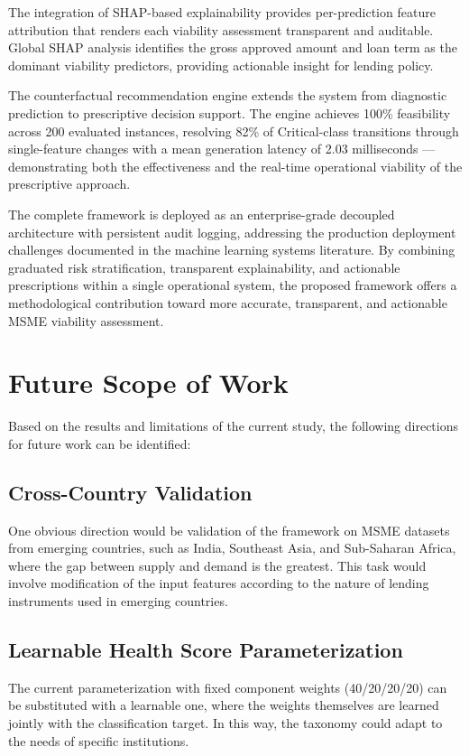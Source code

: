 \documentclass[12pt,a4paper]{report}
\begin{document}
The integration of SHAP-based explainability provides per-prediction feature attribution that renders each viability assessment transparent and auditable. Global SHAP analysis identifies the gross approved amount and loan term as the dominant viability predictors, providing actionable insight for lending policy.

The counterfactual recommendation engine extends the system from diagnostic prediction to prescriptive decision support. The engine achieves 100\% feasibility across 200 evaluated instances, resolving 82\% of Critical-class transitions through single-feature changes with a mean generation latency of 2.03 milliseconds --- demonstrating both the effectiveness and the real-time operational viability of the prescriptive approach.

The complete framework is deployed as an enterprise-grade decoupled architecture with persistent audit logging, addressing the production deployment challenges documented in the machine learning systems literature. By combining graduated risk stratification, transparent explainability, and actionable prescriptions within a single operational system, the proposed framework offers a methodological contribution toward more accurate, transparent, and actionable MSME viability assessment.


\chapter{Future Scope of Work}

Based on the results and limitations of the current study, the following directions for future work can be identified:

\section{Cross-Country Validation}
One obvious direction would be validation of the framework on MSME datasets from emerging countries, such as India, Southeast Asia, and Sub-Saharan Africa, where the gap between supply and demand is the greatest. This task would involve modification of the input features according to the nature of lending instruments used in emerging countries.

\section{Learnable Health Score Parameterization}
The current parameterization with fixed component weights (40/20/20/20) can be substituted with a learnable one, where the weights themselves are learned jointly with the classification target. In this way, the taxonomy could adapt to the needs of specific institutions.
\end{document}
